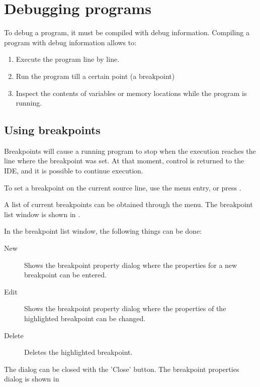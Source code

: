 \section{Debugging programs}
\label{se:debugging}
To debug a program, it must be compiled with debug information. Compiling a
program with debug information allows to:
\begin{enumerate}
\item Execute the program line by line.
\item Run the program till a certain point (a breakpoint)
\item Inspect the contents of variables or memory locations while the
program is running.
\end{enumerate}
%
%
\subsection{Using breakpoints}
Breakpoints will cause a running program to stop when the execution
reaches the line where the breakpoint was set. At that moment, control
is returned to the IDE, and it is possible to continue execution.

To set a breakpoint on the current source line, use the 
 menu entry, or press .

A list of current breakpoints can be obtained through the
 menu. The breakpoint list window
is shown in .


In the breakpoint list window, the following things can be done:
\begin{description}
\item[New] Shows the breakpoint property dialog where the properties
for a new breakpoint can be entered. 
\item[Edit] Shows the breakpoint property dialog where the properties of
the highlighted breakpoint can be changed. 
\item[Delete] Deletes the highlighted breakpoint.
\end{description}
The dialog can be closed with the 'Close' button.
The breakpoint properties dialog is shown in 


